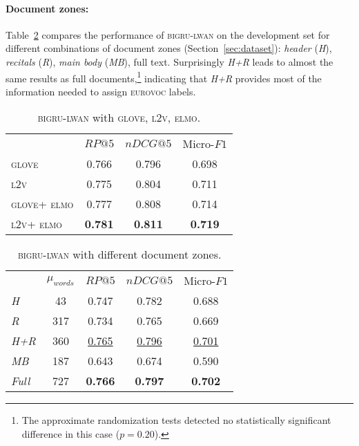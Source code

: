 \documentclass[11pt,a4paper]{article}
\newcommand{\lwangru}{\textsc{bigru-lwan}\xspace}
\newcommand{\glove}{\textsc{glove}\xspace}
\newcommand{\lawvec}{\textsc{l2v}\xspace}
\newcommand{\elmo}{\textsc{elmo}\xspace}
\newcommand{\eurovoc}{\textsc{eurovoc}\xspace}
\begin{document}
\paragraph{Document zones:} 
Table~\ref{tab:zones} compares the performance of \lwangru on the development set for different combinations of document zones (Section~\ref{sec:dataset}): \emph{header} (\emph{H}), \emph{recitals}  (\emph{R}), \emph{main body} (\emph{MB}), full text. Surprisingly \emph{H+R} leads to almost the same results as full documents,\footnote{The approximate randomization tests detected no statistically significant difference in this case ($p = 0.20$).} indicating that \emph{H+R} provides most of the information needed to assign \eurovoc labels.

\begin{table}[ht!]
\centering
\footnotesize\addtolength{\tabcolsep}{-2pt}
\begin{tabular}{lccc}
  & $RP@5$ & $nDCG@5$ & Micro-$F1$ \\
\cline{2-4}
\glove & 0.766 & 0.796 & 0.698 \\
\lawvec & 0.775 & 0.804 & 0.711 \\
\glove + \elmo & 0.777 & 0.808 & 0.714\\
\lawvec + \elmo & \textbf{0.781} & \textbf{0.811} & \textbf{0.719}\\
\end{tabular}
\caption{\lwangru with \glove, \lawvec, \elmo.}
\label{tab:embs}
\end{table}
\vspace{-0.5em}
\begin{table}[ht!]
\centering
\footnotesize\addtolength{\tabcolsep}{-2pt}
\begin{tabular}{lcccc}
  & $\mu_{words}$ & $RP@5$ & $nDCG@5$ & Micro-$F1$ \\
\cline{2-5}
\emph{H} & 43 & 0.747 & 0.782 & 0.688 \\
\emph{R}  & 317 & 0.734 & 0.765 & 0.669 \\
\emph{H+R} & 360 & \underline{0.765} & \underline{0.796} & \underline{0.701} \\
\emph{MB} & 187 & 0.643 & 0.674 & 0.590 \\
\emph{Full} & 727 & \textbf{0.766} & \textbf{0.797} & \textbf{0.702} \\
\end{tabular}
\caption{\lwangru with different document zones.}
\vspace*{-4mm}
\label{tab:zones}
\end{table}
\end{document}
